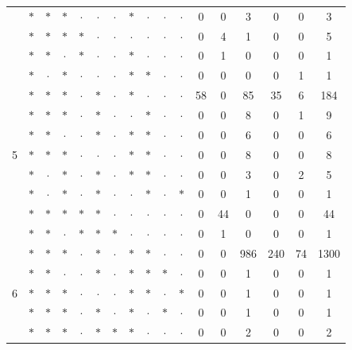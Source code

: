 \documentclass[11pt,a5paper,twoside]{book}
\begin{document}
{\begin{table}[ht!]
{\begin{tabular}{rcccccccccccccccc}
   &  $\ast$& $\ast$& $\ast$& $\cdot$& $\cdot$& $\cdot$& $\ast$& $\cdot$&  $\cdot$&  $\cdot$ & 0 & 0 & 3 & 0 & 0 & 3 \\
   &  $\ast$& $\ast$& $\ast$& $\ast$& $\cdot$& $\cdot$& $\cdot$& $\cdot$&  $\cdot$&  $\cdot$ & 0 & 4 & 1 & 0 & 0 & 5 \\
   &  $\ast$& $\ast$& $\cdot$& $\ast$& $\cdot$& $\cdot$& $\ast$& $\cdot$&  $\cdot$&  $\cdot$ & 0 & 1 & 0 & 0 & 0 & 1 \\
  &  $\ast$& $\cdot$& $\ast$& $\cdot$& $\cdot$& $\cdot$& $\ast$& $\ast$&  $\cdot$&  $\cdot$ & 0 & 0 & 0 & 0 & 1 & 1 \\ \hline
   &  $\ast$& $\ast$& $\ast$& $\cdot$& $\ast$& $\cdot$& $\ast$& $\cdot$&  $\cdot$&  $\cdot$ & 58 & 0 & 85 & 35 & 6 & 184 \\
   &  $\ast$& $\ast$& $\ast$& $\cdot$& $\ast$& $\cdot$& $\cdot$& $\ast$&  $\cdot$&  $\cdot$ & 0 & 0 & 8 & 0 & 1 & 9 \\
   &  $\ast$& $\ast$& $\cdot$& $\cdot$& $\ast$& $\cdot$& $\ast$& $\ast$&  $\cdot$&  $\cdot$ & 0 & 0 & 6 & 0 & 0 & 6 \\
  5 &  $\ast$& $\ast$& $\ast$& $\cdot$& $\cdot$& $\cdot$& $\ast$& $\ast$&  $\cdot$&  $\cdot$ & 0 & 0 & 8 & 0 & 0 & 8 \\
   & $\ast$& $\cdot$& $\ast$& $\cdot$& $\ast$& $\cdot$& $\ast$& $\ast$&  $\cdot$&  $\cdot$ & 0 & 0 & 3 & 0 & 2 & 5 \\
   & $\ast$& $\cdot$& $\ast$& $\cdot$& $\ast$& $\cdot$& $\cdot$& $\ast$&  $\cdot$&  $\ast$ & 0 & 0 & 1 & 0 & 0 & 1 \\
   & $\ast$& $\ast$& $\ast$& $\ast$& $\ast$& $\cdot$& $\cdot$& $\cdot$&  $\cdot$&  $\cdot$ & 0 & 44 & 0 & 0 & 0 & 44 \\
   & $\ast$& $\ast$& $\cdot$& $\ast$& $\ast$& $\ast$& $\cdot$& $\cdot$&  $\cdot$&  $\cdot$ & 0 & 1 & 0 & 0 & 0 & 1 \\ \hline
   & $\ast$& $\ast$& $\ast$& $\cdot$& $\ast$& $\cdot$& $\ast$& $\ast$&  $\cdot$&  $\cdot$ & 0 & 0 & 986 & 240 & 74 & 1300 \\
   & $\ast$& $\ast$& $\cdot$& $\cdot$& $\ast$& $\cdot$& $\ast$& $\ast$&  $\ast$&  $\cdot$ & 0 & 0 & 1 & 0 & 0 & 1 \\
  6 & $\ast$& $\ast$& $\ast$& $\cdot$& $\cdot$& $\cdot$& $\ast$& $\ast$&  $\cdot$&  $\ast$ & 0 & 0 & 1 & 0 & 0 & 1 \\
   & $\ast$& $\ast$& $\ast$& $\cdot$& $\ast$& $\cdot$& $\ast$& $\cdot$&  $\ast$&  $\cdot$ & 0 & 0 & 1 & 0 & 0 & 1 \\
  & $\ast$& $\ast$& $\ast$& $\cdot$& $\ast$& $\ast$& $\ast$& $\cdot$&  $\cdot$&  $\cdot$ & 0 & 0 & 2 & 0 & 0 & 2 \\
   \hline\hline
\end{tabular}}
\end{table}

}
\end{document}
